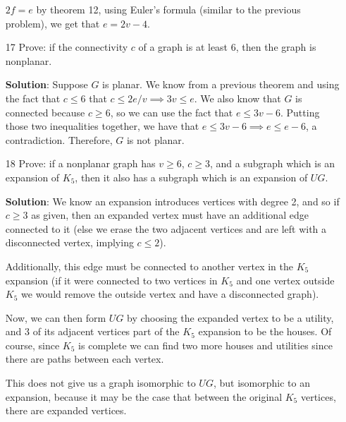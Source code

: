 \documentclass{article}
\begin{document}
\begin{enumerate}
	$2f = e$ by theorem 12, using Euler's formula (similar to the previous problem), we get that $e = 2v - 4$.
	
	\item[17] Prove: if the connectivity $c$ of a graph is at least 6, then the graph is nonplanar.
	
	\textbf{Solution}: Suppose $G$ is planar. We know from a previous theorem and using the fact that $c \leq 6$ that $c \leq 2e/v \implies 3v \leq e$. We also know that $G$ is connected because $c \geq 6$, so we can use the fact that $e \leq 3v - 6$. Putting those two inequalities together, we have that $e \leq 3v - 6 \implies e\leq e - 6$, a contradiction. Therefore, $G$ is not planar. 
	
	\item[18] Prove: if a nonplanar graph has $v \geq 6$, $c \geq 3$, and a subgraph which is an expansion of $K_5$, then it also has a subgraph which is an expansion of $UG$. 
	
	\textbf{Solution}: We know an expansion introduces vertices with degree 2, and so if $c \geq 3$ as given, then an expanded vertex must have an additional edge connected to it (else we erase the two adjacent vertices and are left with a disconnected vertex, implying $c \leq 2$). 

Additionally, this edge must be connected to another vertex in the $K_5$ expansion (if it were connected to two vertices in $K_5$ and one vertex outside $K_5$ we would remove the outside vertex and have a disconnected graph).

Now, we can then form $UG$ by choosing the expanded vertex to be a utility, and 3 of its adjacent vertices part of the $K_5$ expansion to be the houses. Of course, since $K_5$ is complete we can find two more houses and utilities since there are paths between each vertex.

This does not give us a graph isomorphic to $UG$, but isomorphic to an expansion, because it may be the case that between the original $K_5$ vertices, there are expanded vertices.
	
\end{enumerate}
\end{document}
